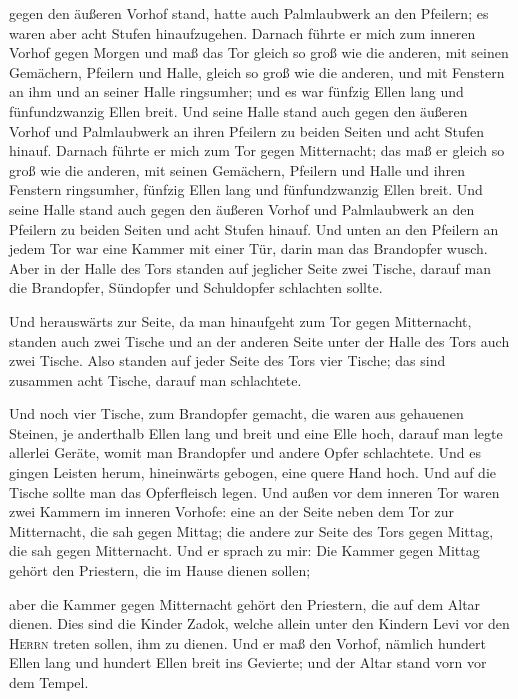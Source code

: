 gegen den äußeren Vorhof stand, hatte auch Palmlaubwerk an den Pfeilern;
es waren aber acht Stufen hinaufzugehen.  Darnach führte
er mich zum inneren Vorhof gegen Morgen und maß das Tor gleich so groß
wie die anderen,  mit seinen Gemächern, Pfeilern und
Halle, gleich so groß wie die anderen, und mit Fenstern an ihm und an
seiner Halle ringsumher; und es war fünfzig Ellen lang und
fünfundzwanzig Ellen breit.  Und seine Halle stand auch
gegen den äußeren Vorhof und Palmlaubwerk an ihren Pfeilern zu beiden
Seiten und acht Stufen hinauf.  Darnach führte er mich
zum Tor gegen Mitternacht; das maß er gleich so groß wie die anderen,
 mit seinen Gemächern, Pfeilern und Halle und ihren
Fenstern ringsumher, fünfzig Ellen lang und fünfundzwanzig Ellen breit.
 Und seine Halle stand auch gegen den äußeren Vorhof und
Palmlaubwerk an den Pfeilern zu beiden Seiten und acht Stufen hinauf.
 Und unten an den Pfeilern an jedem Tor war eine Kammer
mit einer Tür, darin man das Brandopfer wusch.  Aber in
der Halle des Tors standen auf jeglicher Seite zwei Tische, darauf man
die Brandopfer, Sündopfer und Schuldopfer schlachten sollte.

 Und herauswärts zur Seite, da man hinaufgeht zum Tor
gegen Mitternacht, standen auch zwei Tische und an der anderen Seite
unter der Halle des Tors auch zwei Tische.  Also standen
auf jeder Seite des Tors vier Tische; das sind zusammen acht Tische,
darauf man schlachtete.

 Und noch vier Tische, zum Brandopfer gemacht, die waren
aus gehauenen Steinen, je anderthalb Ellen lang und breit und eine Elle
hoch, darauf man legte allerlei Geräte, womit man Brandopfer und andere
Opfer schlachtete.  Und es gingen Leisten herum,
hineinwärts gebogen, eine quere Hand hoch. Und auf die Tische sollte man
das Opferfleisch legen.  Und außen vor dem inneren Tor
waren zwei Kammern im inneren Vorhofe: eine an der Seite neben dem Tor
zur Mitternacht, die sah gegen Mittag; die andere zur Seite des Tors
gegen Mittag, die sah gegen Mitternacht.  Und er sprach
zu mir: Die Kammer gegen Mittag gehört den Priestern, die im Hause
dienen sollen;

 aber die Kammer gegen Mitternacht gehört den Priestern,
die auf dem Altar dienen. Dies sind die Kinder Zadok, welche allein
unter den Kindern Levi vor den \textsc{Herrn} treten sollen, ihm zu
dienen.  Und er maß den Vorhof, nämlich hundert Ellen
lang und hundert Ellen breit ins Gevierte; und der Altar stand vorn vor
dem Tempel.

